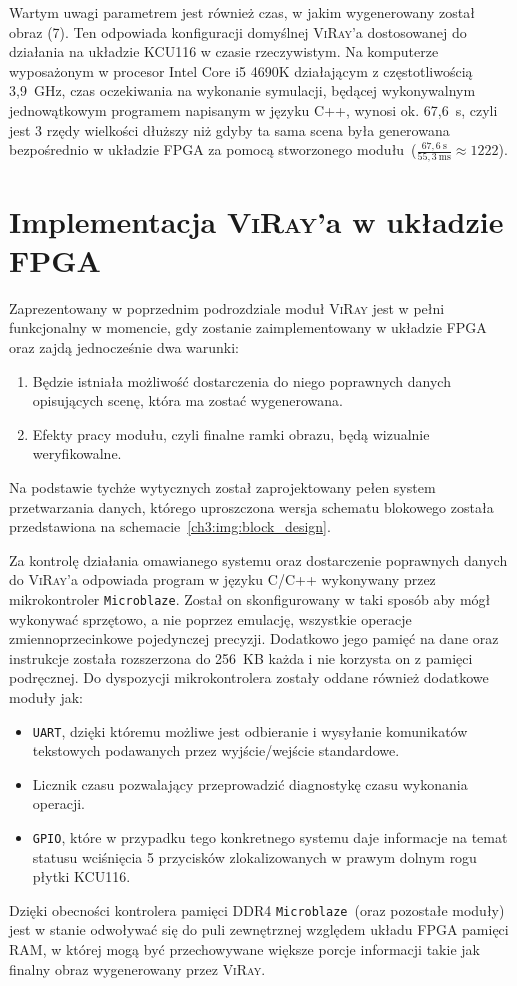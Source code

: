 Wartym uwagi parametrem jest również czas, w jakim wygenerowany został obraz (7). Ten odpowiada konfiguracji domyślnej \textsc{ViRay}'a dostosowanej do działania na układzie KCU116 w czasie rzeczywistym. Na komputerze wyposażonym w procesor Intel Core i5 4690K działającym z częstotliwością 3,9~GHz, czas oczekiwania na wykonanie symulacji, będącej wykonywalnym jednowątkowym programem napisanym w języku C++, wynosi ok. 67,6~s, czyli jest 3 rzędy wielkości dłuższy niż gdyby ta sama scena była generowana bezpośrednio w układzie FPGA za pomocą stworzonego modułu~($\frac{67,6~\mathrm{s}}{55,3~\mathrm{ms}}\approx 1222$). 







\section{Implementacja \textsc{ViRay}'a w układzie FPGA}
Zaprezentowany w poprzednim podrozdziale moduł \textsc{ViRay} jest w pełni funkcjonalny w momencie, gdy zostanie zaimplementowany w układzie FPGA oraz zajdą jednocześnie dwa warunki:
\begin{enumerate}
\item Będzie istniała możliwość dostarczenia do niego poprawnych danych opisujących scenę, która ma zostać wygenerowana.
\item Efekty pracy modułu, czyli finalne ramki obrazu, będą wizualnie weryfikowalne.
\end{enumerate}
Na podstawie tychże wytycznych został zaprojektowany pełen system przetwarzania danych, którego uproszczona wersja schematu blokowego została przedstawiona na schemacie~\ref{ch3:img:block_design}.

Za kontrolę działania omawianego systemu oraz dostarczenie poprawnych danych do \textsc{ViRay}'a odpowiada program w języku C/C++ wykonywany przez mikrokontroler \texttt{Microblaze}. Został on skonfigurowany w taki sposób aby mógł wykonywać sprzętowo, a nie poprzez emulację, wszystkie operacje zmiennoprzecinkowe pojedynczej precyzji. Dodatkowo jego pamięć na dane oraz instrukcje została rozszerzona do 256~KB każda i nie korzysta on z pamięci podręcznej. Do dyspozycji mikrokontrolera zostały oddane również dodatkowe moduły jak:
\begin{itemize}
\item \texttt{UART}, dzięki któremu możliwe jest odbieranie i wysyłanie komunikatów tekstowych podawanych przez wyjście/wejście standardowe.
\item Licznik czasu pozwalający przeprowadzić diagnostykę czasu wykonania operacji.
\item \texttt{GPIO}, które w przypadku tego konkretnego systemu daje informacje na temat statusu wciśnięcia 5 przycisków zlokalizowanych w prawym dolnym rogu płytki KCU116.
\end{itemize}
Dzięki obecności kontrolera pamięci DDR4 \texttt{Microblaze}~(oraz pozostałe moduły) jest w stanie odwoływać się do puli zewnętrznej względem układu FPGA pamięci RAM, w której mogą być przechowywane większe porcje informacji takie jak finalny obraz wygenerowany przez \textsc{ViRay}.

